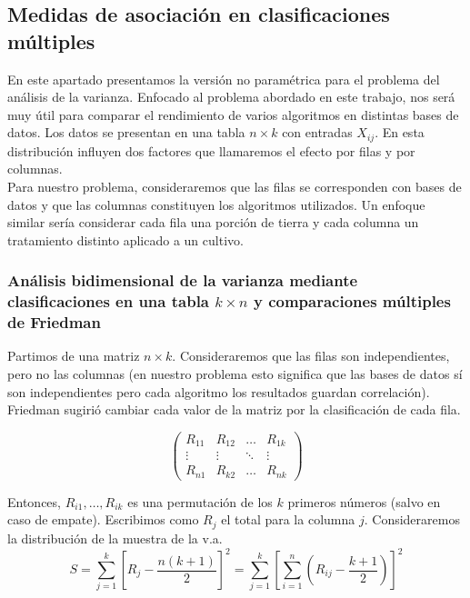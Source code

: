 	
\subsection{Medidas de asociación en clasificaciones múltiples}	

	En este apartado presentamos la versión no paramétrica para el problema del análisis de la varianza. Enfocado al problema abordado en este trabajo, nos será muy útil para comparar el rendimiento de varios algoritmos en distintas bases de datos. Los datos se presentan en una tabla $n \times k$ con entradas $X_{ij}$. En esta distribución influyen dos factores que llamaremos el efecto por filas y por columnas.\\
	 Para nuestro problema, consideraremos que las filas se corresponden con bases de datos y que las columnas constituyen los algoritmos utilizados. Un enfoque similar sería considerar cada fila una porción de tierra y cada columna un tratamiento distinto aplicado a un cultivo.
	
\subsubsection{Análisis bidimensional de la varianza mediante clasificaciones en una tabla $k \times n$ y comparaciones múltiples de Friedman}

	Partimos de una matriz $n \times k$. Consideraremos que las filas son independientes, pero no las columnas (en nuestro problema esto significa que las bases de datos sí son independientes pero cada algoritmo los resultados guardan correlación). Friedman sugirió cambiar cada valor de la matriz por la clasificación de cada fila.
	
	\[ \left( \begin{matrix}
		R_{11} & R_{12} & \dots & R_{1k} \\
		\vdots & \vdots & \ddots & \vdots \\
		R_{n1} & R_{k2} & \dots & R_{nk}
		\end{matrix} \right)	\]

	Entonces, $R_{i1}, \dots, R_{ik}$ es una permutación de los $k$ primeros números (salvo en caso de empate). Escribimos como $R_j$ el total para la columna $j$. Consideraremos la distribución de la muestra de la v.a. 
	\begin{equation}
		 S = \sum\limits_{j=1}^k
				\left[
					R_j - \frac{n(k+1)}{2}
				\right]^2 =
			\sum\limits_{j=1}^k \left[
				\sum\limits_{i=1}^n \left(
					R_{ij} - \frac{k+1}{2}
				\right)
			\right]^2
	\label{S-Friedman}
	\end{equation}
	

